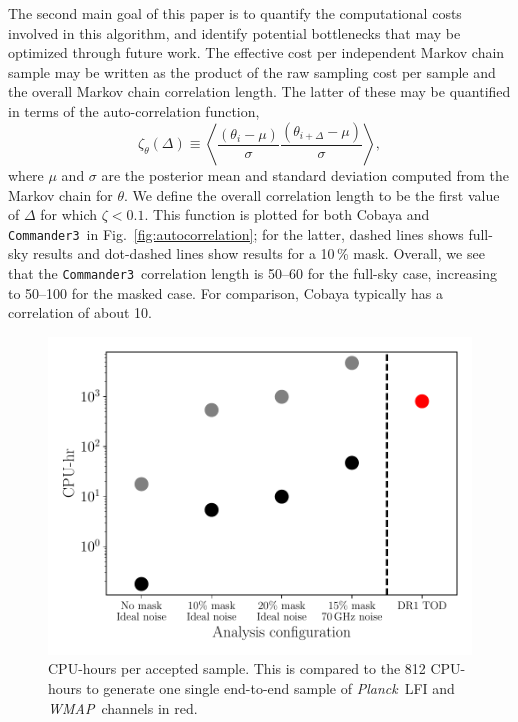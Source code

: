\documentclass[twocolumn]{../common/aa}
\def\wmap{\emph{WMAP}}
\def\planck{\emph{Planck}}
\def\commanderthree{\texttt{Commander3}}
\begin{document}
The second main goal of this paper is to quantify the computational costs involved in this algorithm, and identify potential bottlenecks that may be optimized through future work. The effective cost per independent Markov chain sample may be written as the product of the raw sampling cost per sample and the overall Markov chain correlation length. The latter of these may be quantified in terms of the auto-correlation function,
\begin{equation}
  \zeta_\theta(\Delta) \equiv \left<\frac{(\theta_i - \mu)}{\sigma}\frac{(\theta_{i+\Delta} - \mu)}{\sigma}\right>,
\end{equation}
where $\mu$ and $\sigma$ are the posterior mean and standard deviation computed from the Markov chain for $\theta$. We define the overall correlation length to be the first value of $\Delta$ for which $\zeta < 0.1$. This function is plotted for both Cobaya and \commanderthree\ in Fig.~\ref{fig:autocorrelation}; for the latter, dashed lines shows full-sky results and dot-dashed lines show results for a 10\,\% mask. Overall, we see that the \commanderthree\ correlation length is 50--60 for the full-sky case, increasing to 50--100 for the masked case. For comparison, Cobaya typically has a correlation of about 10.

\begin{figure}
	\centering
	\includegraphics[width=\linewidth]{figures/run_time.pdf}
	\caption{\label{fig:runtime}CPU-hours per accepted sample. This is compared to the 812 CPU-hours to generate one single end-to-end sample of \planck\ LFI and \wmap\ channels in red.}
\end{figure}
\end{document}
